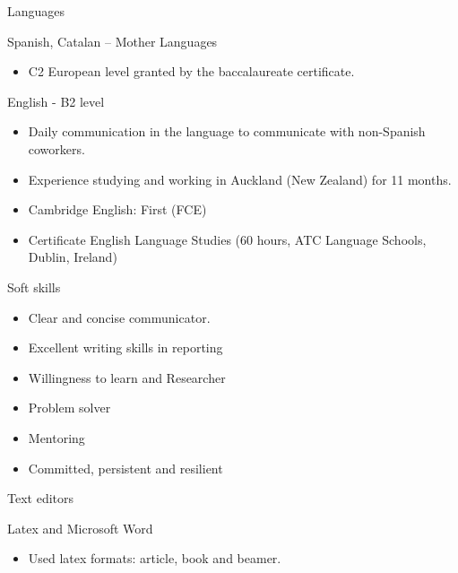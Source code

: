\documentclass[a4paper,10pt]{article}
\newlength{\cvcolumngapwidth}
\newlength{\cvleftcolumnwidth}
\newlength{\cvrightcolumnwidth}
\newcommand{\cvheadingstyle}[1]{{\normalsize\cvheadingfont\textcolor{cvheadingcolor}{#1}}}
\newlength{\cvafteritemskipamount}
\newlength{\cvparskip}
\newcommand{\cvitem}[2]{
    \begin{minipage}[t]{\cvleftcolumnwidth}
        \raggedleft #1
    \end{minipage}%
    \hspace{\cvcolumngapwidth}%
    \begin{minipage}[t]{\cvrightcolumnwidth}
        \setlength{\parskip}{\cvparskip} #2
    \end{minipage}

    \vspace{\cvafteritemskipamount}
}
\begin{document}
\cvitem{
    \cvheadingstyle{Languages}
}{
    Spanish, Catalan -- Mother Languages
    \begin{itemize}
    	\item C2 European level granted by the baccalaureate certificate.
    \end{itemize}
    
    English - B2 level
    \begin{itemize}
        \item Daily communication in the language to communicate with non-Spanish coworkers.   
        \item Experience studying and working in Auckland (New Zealand) for 11 months.
        \item Cambridge English: First (FCE)
        \item Certificate English Language Studies (60 hours, ATC Language Schools, Dublin, Ireland)
    \end{itemize}
}

\cvitem{
    \cvheadingstyle{Soft skills}
}{
    \begin{itemize}
    	\item Clear and concise communicator.
    	\item Excellent writing skills in reporting
    	\item Willingness to learn and Researcher
    	\item Problem solver
    	\item Mentoring
    	\item Committed, persistent and resilient
    \end{itemize}
}

\cvitem{
    \cvheadingstyle{Text editors}
}{
    Latex and Microsoft Word
    \begin{itemize}
        \item Used latex formats: article, book and beamer.
    \end{itemize}
}




\end{document}
